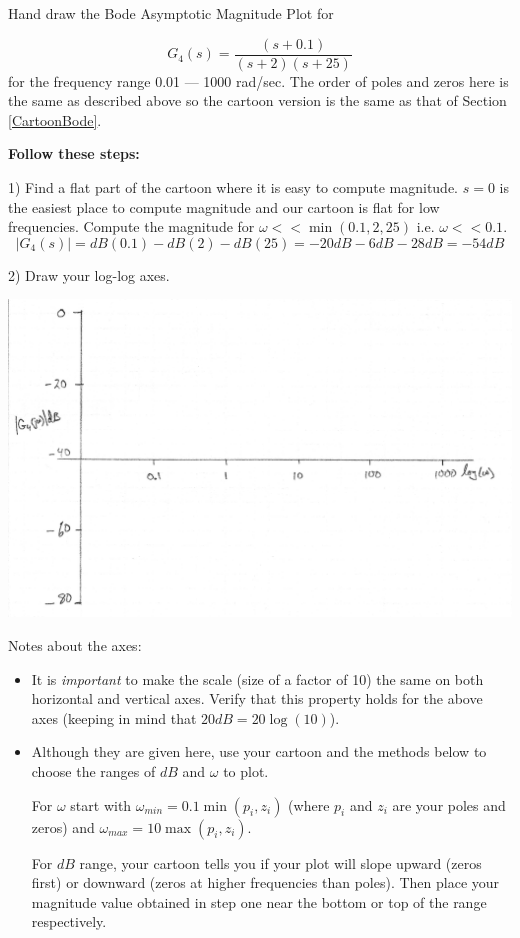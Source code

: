 \begin{Example}\label{firstBodeMagexample}
Hand draw the Bode Asymptotic Magnitude Plot for

\[
G_4(s) = \frac  {(s+0.1)}  {(s+2)(s+25)}
\]
for the frequency range 0.01 --- 1000 rad/sec.  The order of poles and zeros here
is the same as described above so the cartoon version is the same as that of Section \ref{CartoonBode}.

{\bf Follow these steps:}

1) Find a flat part of the cartoon where it is easy to compute magnitude.   $s=0$ is the
easiest place to compute magnitude and our cartoon is flat for low frequencies.
Compute the magnitude for $\omega << \min(0.1, 2, 25)$ i.e. $\omega << 0.1$.
\[
|G_4(s)| = dB(0.1) - dB(2) - dB(25) = -20dB - 6dB - 28dB = -54dB
\]

2) Draw your log-log axes.

\includegraphics[width=6.5in]{figs05/00737a.png}

Notes about the axes:
\begin{itemize}
  \item It is {\it important } to make the scale (size of a factor of 10)
  the same on both horizontal and vertical axes.
  Verify that this property holds for the above axes (keeping in mind that $20dB = 20\log(10)$).

  \item Although they are given here, use your cartoon and the methods below
  to choose the ranges of $dB$ and $\omega$ to plot.

  For $\omega$ start with $\omega_{min} = 0.1 \min(p_i, z_i)$ (where $p_i$ and $z_i$ are your poles and zeros) and $\omega_{max} = 10 \max(p_i,z_i)$.

  For $dB$ range, your cartoon tells you if your plot will slope upward (zeros first) or downward (zeros at higher frequencies than poles).  Then place your magnitude value obtained in step one near the bottom or top of the range respectively.
\end{itemize}


\end{Example}



